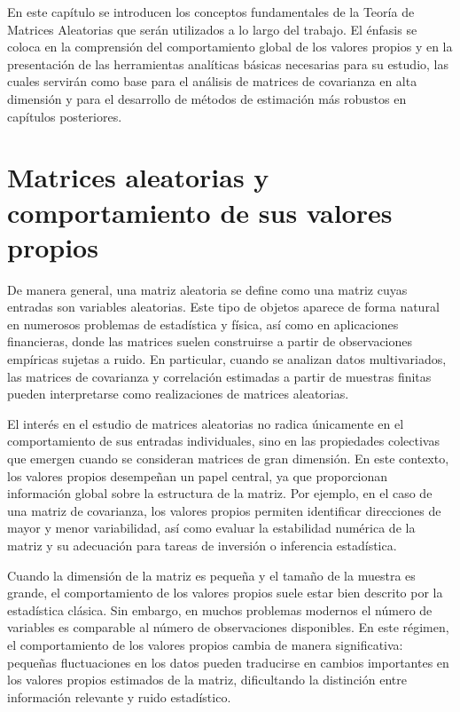 \documentclass[letterpaper,12pt,oneside]{book}
\begin{document}
En este capítulo se introducen los conceptos fundamentales de la Teoría de Matrices Aleatorias que serán utilizados a lo largo del trabajo. El énfasis se coloca en la comprensión del comportamiento global de los valores propios y en la presentación de las herramientas analíticas básicas necesarias para su estudio, las cuales servirán como base para el análisis de matrices de covarianza en alta dimensión y para el desarrollo de métodos de estimación más robustos en capítulos posteriores.

\section{Matrices aleatorias y comportamiento de sus valores propios}

De manera general, una matriz aleatoria se define como una matriz cuyas entradas son variables aleatorias. Este tipo de objetos aparece de forma natural en numerosos problemas de estadística y física, así como en aplicaciones financieras, donde las matrices suelen construirse a partir de
observaciones empíricas sujetas a ruido. En particular, cuando se analizan datos multivariados, las matrices de covarianza y correlación estimadas a partir de muestras finitas pueden interpretarse como realizaciones de matrices aleatorias.

El interés en el estudio de matrices aleatorias no radica únicamente en el comportamiento de sus entradas individuales, sino en las propiedades colectivas que emergen cuando se consideran matrices de gran dimensión. En este contexto, los valores propios desempeñan un papel central, ya que
proporcionan información global sobre la estructura de la matriz. Por ejemplo, en el caso de una matriz de covarianza, los valores propios permiten identificar direcciones de mayor y menor variabilidad, así como evaluar la estabilidad numérica de la matriz y su adecuación para tareas de
inversión o inferencia estadística.

Cuando la dimensión de la matriz es pequeña y el tamaño de la muestra es grande, el comportamiento de los valores propios suele estar bien descrito por la estadística clásica. Sin embargo, en muchos problemas modernos el número de variables es comparable al número de observaciones disponibles.
En este régimen, el comportamiento de los valores propios cambia de manera significativa: pequeñas fluctuaciones en los datos pueden traducirse en cambios importantes en los valores propios estimados de la matriz, dificultando la distinción entre información relevante y ruido estadístico.
\end{document}
